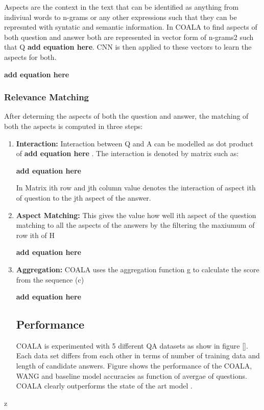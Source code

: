 \documentclass[11pt]{article}
\begin{document}
Aspects are the context in the text that can be identified as anything from indiviual words to n-grams or any other expressions such that they can be represnted with syntatic and semantic information. In COALA to find aspects of both question and answer both are represented in vector form of n-grams2 such that Q 
\textbf{add equation here}. CNN is then applied to these vectors to learn the aspects for both.

\textbf{add equation here}


\subsubsection{Relevance Matching}
After determing the aspects of both the question and answer, the matching of both the aspects is computed in three steps: 

\begin{enumerate}

\item \textbf{Interaction:}
Interaction between Q and A can be modelled as dot product of \textbf{add equation here} . The interaction is denoted by matrix such as:

\textbf{add equation here} 

In Matrix ith row and jth column value denotes the interaction of aspect ith of question to the jth aspect of the answer.

\item \textbf{Aspect Matching:} This gives the value how well ith aspect of the question matching to all the aspects of the answers by the filtering the maxiumum of row ith of H

\textbf{add equation here} 

\item \textbf{Aggregation:} COALA uses the aggregation function g to calculate the score from the sequence (c)

\textbf{add equation here} 



\subsection{Performance}

COALA is experimented with 5 different QA datasets as show in figure []. Each data set differs from each other in terms of number of training data and length of candidate answers. Figure shows the performance of the COALA, WANG and baseline model accuracies as function of avergae of questions. COALA clearly outperforms the state of the art model .



\end {enumerate}


 


 



































z
\end{document}
